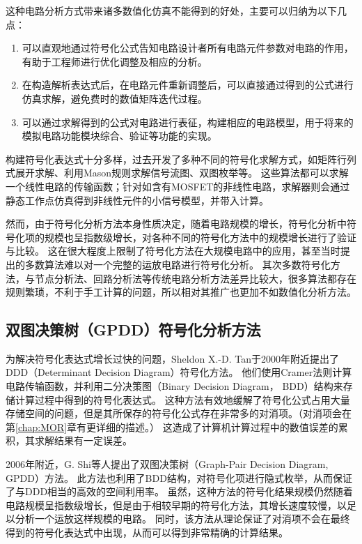 这种电路分析方式带来诸多数值化仿真不能得到的好处，主要可以归纳为以下几点：

\begin{enumerate}[label=\emph{\alph*})]
	\item 可以直观地通过符号化公式告知电路设计者所有电路元件参数对电路的作用，有助于工程师进行优化调整及相应的分析。
	\item 在构造解析表达式后，在电路元件重新调整后，可以直接通过得到的公式进行仿真求解，避免费时的数值矩阵迭代过程。
	\item 可以通过求解得到的公式对电路进行表征，构建相应的电路模型，用于将来的模拟电路功能模块综合、验证等功能的实现。
\end{enumerate}

构建符号化表达式十分多样，过去开发了多种不同的符号化求解方式，如矩阵行列式展开求解\parencite{Gielen-ISAAC-1989}、利用Mason规则求解信号流图\parencite{Nebel-SFG-1995,Fino-SFG-1998}、双图枚举\parencite{Shieu-TG-1974}等。
这些算法都可以求解一个线性电路的传输函数；针对如含有MOSFET的非线性电路，求解器则会通过静态工作点仿真得到非线性元件的小信号模型，并带入计算。

然而，由于符号化分析方法本身性质决定，随着电路规模的增长，符号化分析中符号化项的规模也呈指数级增长，\parencite{Gielen-SymbSurvey-1998}对各种不同的符号化方法中的规模增长进行了验证与比较。
这在很大程度上限制了符号化方法在大规模电路中的应用，甚至当时提出的多数算法难以对一个完整的运放电路进行符号化分析。
其次多数符号化方法，与节点分析法、回路分析法等传统电路分析方法差异比较大，很多算法都存在规则繁琐，不利于手工计算的问题，所以相对其推广也更加不如数值化分析方法。

\subsection{双图决策树（GPDD）符号化分析方法}
\label{subsec:intro:symbolic:gpdd}

为解决符号化表达式增长过快的问题，Sheldon X.-D. Tan于2000年附近提出了DDD（Determinant Decision Diagram）符号化方法。
他们使用Cramer法则计算电路传输函数，并利用二分决策图（Binary Decision Diagram， BDD）结构\parencite{Bryant-BDD-1986}来存储计算过程中得到的符号化表达式\parencite{Sheldon-DDD-2000}。
这种方法有效地缓解了符号化公式占用大量存储空间的问题，但是其所保存的符号化公式存在非常多的对消项。（对消项会在第\ref{chap:MOR}章有更详细的描述。）
这造成了计算机计算过程中的数值误差的累积，其求解结果有一定误差。

2006年附近，G. Shi等人提出了双图决策树（Graph-Pair Decision Diagram, GPDD）方法\parencite{ChenWeiWei-Thesis,GShi-GPDD-2013,GShi-GPDD,GShi-GPDDSurvey-2013}。
此方法也利用了BDD结构，对符号化项进行隐式枚举，从而保证了与DDD相当的高效的空间利用率。
虽然，这种方法的符号化结果规模仍然随着电路规模呈指数级增长，但是由于相较早期的符号化方法，其增长速度较慢，以足以分析一个运放这样规模的电路。
同时，该方法从理论保证了对消项不会在最终得到的符号化表达式中出现，从而可以得到非常精确的计算结果。

